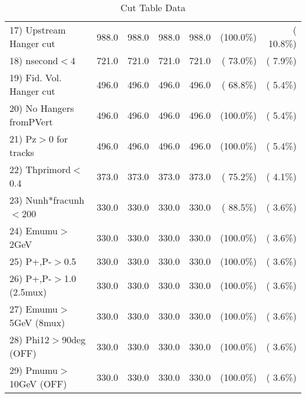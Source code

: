 \begin{table}[h!]
\begin{tabular}{||l||r|r|r|r|r|r||}
 17) Upstream Hanger cut  &        988.0 &        988.0 &        988.0 &        988.0 & (100.0\%) & ( 10.8\%) \\
 18) nsecond$<$4          &        721.0 &        721.0 &        721.0 &        721.0 & ( 73.0\%) & (  7.9\%) \\
 19) Fid. Vol. Hanger cut &        496.0 &        496.0 &        496.0 &        496.0 & ( 68.8\%) & (  5.4\%) \\
 20) No Hangers fromPVert &        496.0 &        496.0 &        496.0 &        496.0 & (100.0\%) & (  5.4\%) \\
 21) Pz$>$0 for tracks    &        496.0 &        496.0 &        496.0 &        496.0 & (100.0\%) & (  5.4\%) \\
 22) Thprimord$<$0.4      &        373.0 &        373.0 &        373.0 &        373.0 & ( 75.2\%) & (  4.1\%) \\
 23) Nunh*fracunh$<$200   &        330.0 &        330.0 &        330.0 &        330.0 & ( 88.5\%) & (  3.6\%) \\
 24) Emumu$>$2GeV         &        330.0 &        330.0 &        330.0 &        330.0 & (100.0\%) & (  3.6\%) \\
 25) P+,P-$>$0.5          &        330.0 &        330.0 &        330.0 &        330.0 & (100.0\%) & (  3.6\%) \\
 26) P+,P-$>$1.0 (2.5mux) &        330.0 &        330.0 &        330.0 &        330.0 & (100.0\%) & (  3.6\%) \\
 27) Emumu$>$5GeV  (8mux) &        330.0 &        330.0 &        330.0 &        330.0 & (100.0\%) & (  3.6\%) \\
 28) Phi12$>$90deg  (OFF) &        330.0 &        330.0 &        330.0 &        330.0 & (100.0\%) & (  3.6\%) \\
 29) Pmumu$>$10GeV  (OFF) &        330.0 &        330.0 &        330.0 &        330.0 & (100.0\%) & (  3.6\%) \\
 \hline
 \hline
 \end{tabular}
 \caption{Cut Table  Data     }
 \label{tab-cutcohjpsi-mumu_data}
 \end{table}
